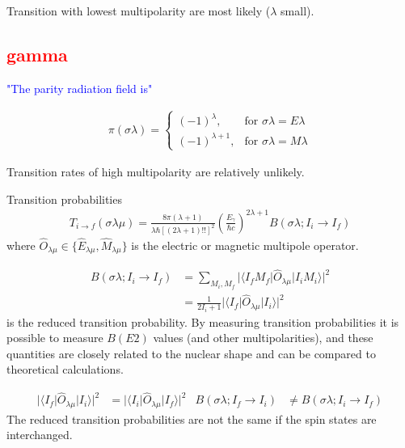 \documentclass[twoside,english]{uiofysmaster/uiofysmaster}
\begin{document}
Transition with lowest multipolarity are most likely ($\lambda$ small).


\subsection{\textcolor{red}{gamma}}

\textcolor{blue}{"The parity radiation field is"} \cite{Krane}

\begin{align}
	\pi (\sigma \lambda) =
    \begin{cases}
    		(-1)^\lambda, & \text{for } \sigma \lambda = E\lambda \\
    		(-1)^{\lambda + 1}, & \text{for } \sigma \lambda = M\lambda
    \end{cases}
\end{align}




Transition rates of high multipolarity are relatively unlikely.

Transition probabilities
\begin{align}
	T_{i \rightarrow f} (\sigma \lambda \mu) = \frac{8\pi (\lambda + 1)}{\lambda \hbar [(2\lambda + 1)!!]^2} \left( \frac{E_\gamma}{\hbar c} \right)^{2\lambda + 1} B(\sigma \lambda; I_i \rightarrow I_f)
\end{align}
where $\hat{O}_{\lambda \mu} \in \{ \hat{E}_{\lambda \mu}, \hat{M}_{\lambda \mu} \}$ is the electric or magnetic multipole operator.

\begin{align}
	B(\sigma \lambda; I_i \rightarrow I_f) &= \sum_{M_i, M_f} | \langle I_f M_f | \hat{O}_{\lambda \mu} | I_i M_i \rangle |^2  \nonumber \\
	&= \frac{1}{2I_i + 1} | \langle I_f | \hat{O}_{\lambda \mu} | I_i \rangle |^2
\end{align}
is the reduced transition probability.
By measuring transition probabilities it is possible to measure $B(E2)$ values (and other multipolarities), and these quantities are closely related to the nuclear shape and can be compared to theoretical calculations.

\begin{align}
	| \langle I_f | \hat{O}_{\lambda \mu} | I_i \rangle |^2 &= | \langle I_i | \hat{O}_{\lambda \mu} | I_f \rangle |^2 &  B(\sigma \lambda; I_f \rightarrow I_i) &\neq B(\sigma \lambda; I_i \rightarrow I_f)
\end{align}
The reduced transition probabilities are not the same if the spin states are interchanged. 
\end{document}

